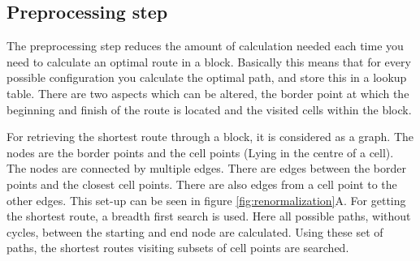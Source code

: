\subsection{Preprocessing step}

The preprocessing step reduces the amount of calculation needed each time you
need to calculate an optimal route in a block. Basically this means that for
every possible configuration you calculate the optimal path, and store this in
a lookup table. There are two aspects which can be altered, the border point
at which the beginning and finish of the route is located and the visited
cells within the block.

For retrieving the shortest route through a block, it is considered as a
graph. The nodes are the border points and the cell points (Lying in the
centre of a cell). The nodes are connected by multiple edges. There are edges
between the border points and the closest cell points. There are also edges
from a cell point to the other edges. This set-up can be seen in figure
\ref{fig:renormalization}A. For getting the shortest route, a breadth first
search is used. Here all possible paths, without cycles, between the starting
and end node are calculated. Using these set of paths, the shortest routes
visiting subsets of cell points are searched.

